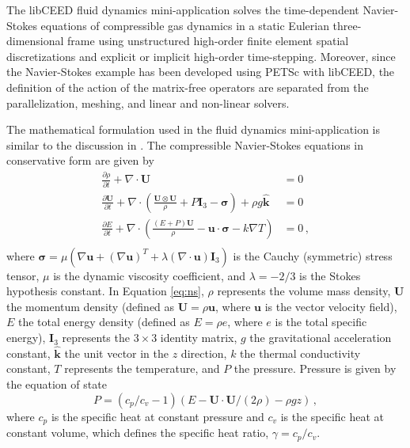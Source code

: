 The libCEED \cite{libceed-user-manual} fluid dynamics mini-application solves the time-dependent Navier-Stokes equations of compressible gas dynamics in a static Eulerian three-dimensional frame using unstructured high-order finite element spatial discretizations and explicit or implicit high-order time-stepping.
Moreover, since the Navier-Stokes example has been developed using PETSc with libCEED, the definition of the action of the matrix-free operators are separated from the parallelization, meshing, and linear and non-linear solvers.

The mathematical formulation used in the fluid dynamics mini-application is similar to the discussion in \cite{giraldoetal2010}.
The compressible Navier-Stokes equations in conservative form are given by
\begin{equation}
   \begin{aligned}
   \frac{\partial \rho}{\partial t} + \nabla \cdot \mathbf{U} &= 0 \\
   \frac{\partial \mathbf{U}}{\partial t} + \nabla \cdot \left( \frac{\mathbf{U} \otimes \mathbf{U}}{\rho} + P \mathbf{I}_3 - \mathbf\sigma \right) + \rho g \hat{\mathbf{k}} &= 0 \\
   \frac{\partial E}{\partial t} + \nabla \cdot \left( \frac{(E + P)\mathbf{U}}{\rho} -\mathbf{u} \cdot \mathbf{\sigma} - k \nabla T \right) &= 0 \, , \\
   \end{aligned}
\label{eq:ns}
\end{equation}
where $\boldsymbol{\sigma} = \mu \left( \nabla \mathbf{u} + \left( \nabla \mathbf{u} \right)^T + \lambda \left( \nabla \cdot \mathbf{u} \right) \mathbf{I}_3 \right)$ is the Cauchy (symmetric) stress tensor, $\mu$ is the dynamic viscosity coefficient, and $\lambda = - 2/3$ is the Stokes hypothesis constant.
In Equation \ref{eq:ns}, $\rho$ represents the volume mass density, $\mathbf{U}$ the momentum density (defined as $\mathbf{U} = \rho \mathbf{u}$, where $\mathbf{u}$ is the vector velocity field), $E$ the total energy density (defined as $E = \rho e$, where $e$ is the total specific energy), $\mathbf{I}_3$ represents the $3 \times 3$ identity matrix, $g$ the gravitational acceleration constant, $\mathbf{\hat{k}}$ the unit vector in the $z$ direction, $k$ the thermal conductivity constant, $T$ represents the temperature, and $P$ the pressure.
Pressure is given by the equation of state
\begin{equation}
   P = \left( {c_p}/{c_v} -1\right) \left( E - {\mathbf{U} \cdot \mathbf{U}}/{(2 \rho)} - \rho g z \right) \, ,
   \label{eq:ns_state}
\end{equation}
where $c_p$ is the specific heat at constant pressure and $c_v$ is the specific heat at constant volume, which defines the specific heat ratio, $\gamma = c_p / c_v$.

